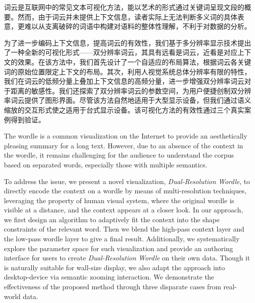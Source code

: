 
\begin{cabstract}
	
	词云是互联网中的常见文本可视化方法，能以艺术的形式通过关键词呈现文段的概要。然而，由于词云并未提供上下文信息，读者实际上无法判断多义词的具体表意，更难以从支离破碎的词语中构建对语料的整体性理解，不利于对数据的分析。
	
	为了进一步编码上下文信息，提高词云的有效性，我们基于多分辨率显示技术提出了一种全新的可视化形式——双分辨率词云，其具有远看是词云，近看是对应上下文的效果。在该方法中，我们首先设计了一个自适应的布局算法，根据词云各关键词的原始位置限定上下文的布局。其次，利用人视觉系统总体分辨率有限的特性，我们在词云的低频分量上叠加上下文信息的高频分量，进一步增强双分辨率词云对于距离的敏感性。我们还探索了双分辨率词云的参数空间，为用户便捷创制双分辨率词云提供了图形界面。尽管该方法自然地适用于大型显示设备，但我们通过语义缩放的交互形式使之适用于台式显示设备。该可视化方法的有效性通过三个真实案例得到验证。
	
\end{cabstract}

\begin{eabstract}
	The wordle is a common visualization on the Internet to provide an aesthetically pleasing summary for a long text. However, due to an absence of the context in the wordle, it remains challenging for the audience to understand the corpus based on separated words, especially those with multiple semantics.
	
	To address the issue, we present a novel visualization, \textit{Dual-Resolution Wordle}, to directly encode the context on a wordle by means of multi-resolution techniques, leveraging the property of human visual system, where the original wordle is visible at a distance, and the context appears at a closer look. In our approach, we first design an algorithm to adaptively fit the context into the shape constraints of the relevant word. Then we blend the high-pass context layer and the low-pass wordle layer to give a final result. Additionally, we systematically explore the parameter space for such visualization and provide an authoring interface for users to create \textit{Dual-Resolution Wordle} on their own data. Though it is naturally suitable for wall-size display, we also adapt the approach into desktop-device via semantic zooming interaction. We demonstrate the effectiveness of the proposed method through three disparate cases from real-world data.
\end{eabstract}


